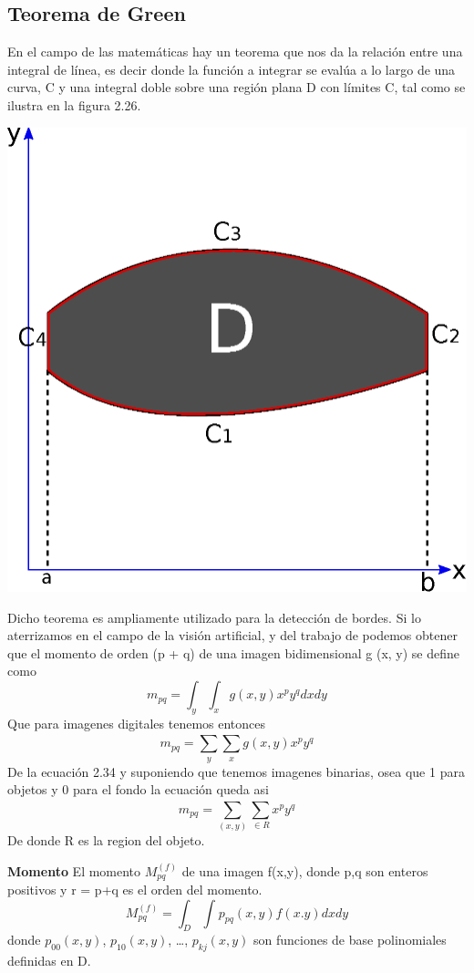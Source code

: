 \subsection{Teorema de Green}
En el campo de las matemáticas hay un teorema que nos da la relación entre una integral
de línea, es decir donde la función a integrar se evalúa a lo largo de una curva, C y una
integral doble sobre una región plana D con límites C, tal como se ilustra en la figura 2.26.
\begin{center}
	\includegraphics[width=0.5 \textwidth]{Contenido/Cuerpo/Capitulo2/Fig18.eps}
	\label{fig:MarcoTeorico:Fig25}
\end{center}
Dicho teorema es ampliamente utilizado para la detección de bordes. Si lo aterrizamos
en el campo de la visión artificial, y del trabajo de \cite{Paper::Lauren1994} podemos
obtener que el momento de orden (p + q) de una imagen bidimensional g (x, y) se define
como
\begin{equation}
	m_{pq} = \int_{y}^{} \int_{x}^{} g(x,y) x^p y^q dx dy
\end{equation}
Que para imagenes digitales tenemos entonces
\begin{equation}
	m_{pq} = \sum_{y}^{}\sum_{x}^{} g(x,y) x^p y^q
\end{equation}
De la ecuación 2.34 y suponiendo que tenemos imagenes binarias, osea que 1 para objetos
y 0 para el fondo la ecuación queda asi
\begin{equation}
	m_{pq} = \sum_{(x,y)}^{}\sum_{\in R}^{}  x^p y^q
\end{equation}
De donde R es la region del objeto.
\begin{definition}{\textbf{Momento}}
	El momento $M_{pq}^{(f)}$ de una imagen f(x,y), donde p,q son enteros positivos y r = p+q es
	el orden del momento.
	\begin{equation}
		M_{pq}^{(f)} = \int_{D}^{} \int_{}^{} p_{pq}(x,y) f(x.y) dxdy
	\end{equation}
	donde $p_{00}(x,y)$, $p_{10}(x,y)$, \dots, $p_{kj}(x,y)$ son funciones de base polinomiales
	definidas en D.
\end{definition}

